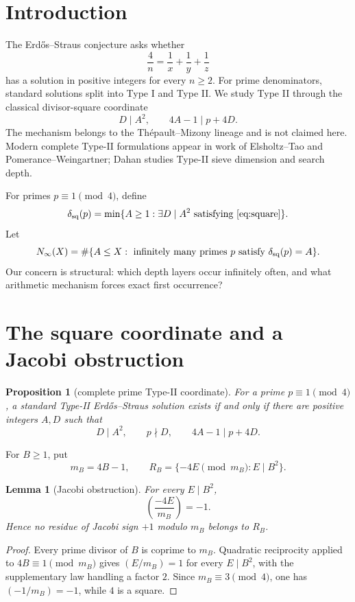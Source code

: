 \documentclass[11pt]{article}
\newtheorem{lemma}[theorem]{Lemma}
\newtheorem{proposition}[theorem]{Proposition}
\theoremstyle{definition}
\newcommand{\sqdepth}{\delta_{\rm sq}}
\begin{document}
\section{Introduction}
The Erd\H{o}s--Straus conjecture asks whether
\[
\frac4n=\frac1x+\frac1y+\frac1z
\]
has a solution in positive integers for every $n\ge2$. For prime denominators, standard solutions split into Type I and Type II. We study Type II through the classical divisor-square coordinate
\begin{equation}\label{eq:square}
D\mid A^2,\qquad 4A-1\mid p+4D.
\end{equation}
The mechanism belongs to the Th\'epault--Mizony lineage and is not claimed here. Modern complete Type-II formulations appear in work of Elsholtz--Tao and Pomerance--Weingartner; Dahan studies Type-II sieve dimension and search depth.

For primes $p\equiv1\pmod4$, define
\[
\sqdepth(p)=\min\{A\ge1:\exists D\mid A^2\text{ satisfying \eqref{eq:square}}\}.
\]
Let
\[
N_\infty(X)=\#\{A\le X:\text{ infinitely many primes }p\text{ satisfy }\sqdepth(p)=A\}.
\]
Our concern is structural: which depth layers occur infinitely often, and what arithmetic mechanism forces exact first occurrence?

\section{The square coordinate and a Jacobi obstruction}
\begin{proposition}[complete prime Type-II coordinate]\label{prop:complete}
For a prime $p\equiv1\pmod4$, a standard Type-II Erd\H{o}s--Straus solution exists if and only if there are positive integers $A,D$ such that
\[
D\mid A^2,\qquad p\nmid D,\qquad 4A-1\mid p+4D.
\]
\end{proposition}

For $B\ge1$, put
\[
m_B=4B-1,
\qquad
R_B=\{-4E\pmod{m_B}:E\mid B^2\}.
\]

\begin{lemma}[Jacobi obstruction]\label{lem:jacobi}
For every $E\mid B^2$,
\[
\boxed{\left(\frac{-4E}{m_B}\right)=-1.}
\]
Hence no residue of Jacobi sign $+1$ modulo $m_B$ belongs to $R_B$.
\end{lemma}

\begin{proof}
Every prime divisor of $B$ is coprime to $m_B$. Quadratic reciprocity applied to $4B\equiv1\pmod{m_B}$ gives $(E/m_B)=1$ for every $E\mid B^2$, with the supplementary law handling a factor $2$. Since $m_B\equiv3\pmod4$, one has $(-1/m_B)=-1$, while $4$ is a square.
\end{proof}
\end{document}
